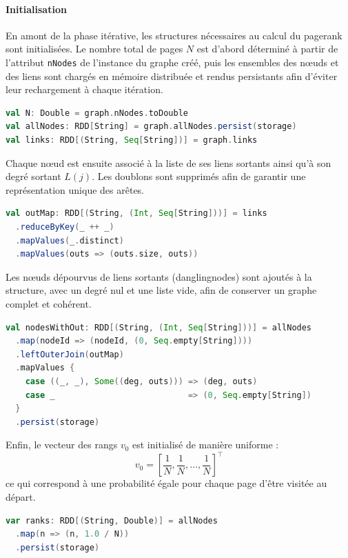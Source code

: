 \documentclass[conference]{IEEEtran}
\begin{document}
\paragraph{Initialisation}

En amont de la phase itérative, les structures nécessaires au calcul du \gls{pagerank} sont initialisées.
Le nombre total de pages $N$ est d'abord déterminé à partir de l'attribut \texttt{nNodes} de l'instance du graphe créé, puis les ensembles des nœuds et des liens sont chargés en mémoire distribuée et rendus persistants afin d'éviter leur rechargement à chaque itération.

\begin{lstlisting}[language=Scala]
val N: Double = graph.nNodes.toDouble
val allNodes: RDD[String] = graph.allNodes.persist(storage)
val links: RDD[(String, Seq[String])] = graph.links
\end{lstlisting}

Chaque nœud est ensuite associé à la liste de ses liens sortants ainsi qu'à son degré sortant $L(j)$.  
Les doublons sont supprimés afin de garantir une représentation unique des arêtes.

\begin{lstlisting}[language=Scala]
val outMap: RDD[(String, (Int, Seq[String]))] = links
  .reduceByKey(_ ++ _)
  .mapValues(_.distinct)
  .mapValues(outs => (outs.size, outs))
\end{lstlisting}

Les nœuds dépourvus de liens sortants (\glspl{danglingnode}) sont ajoutés à la structure, avec un degré nul et une liste vide, afin de conserver un graphe complet et cohérent.

\begin{lstlisting}[language=Scala]
val nodesWithOut: RDD[(String, (Int, Seq[String]))] = allNodes
  .map(nodeId => (nodeId, (0, Seq.empty[String])))
  .leftOuterJoin(outMap)
  .mapValues {
    case ((_, _), Some((deg, outs))) => (deg, outs)
    case _                           => (0, Seq.empty[String])
  }
  .persist(storage)
\end{lstlisting}

Enfin, le vecteur des rangs $v_0$ est initialisé de manière uniforme :
\[
v_0 = \left[ \frac{1}{N}, \frac{1}{N}, \ldots, \frac{1}{N} \right]^{\top}
\]
ce qui correspond à une probabilité égale pour chaque page d'être visitée au départ.

\begin{lstlisting}[language=Scala]
var ranks: RDD[(String, Double)] = allNodes
  .map(n => (n, 1.0 / N))
  .persist(storage)
\end{lstlisting}
\end{document}
